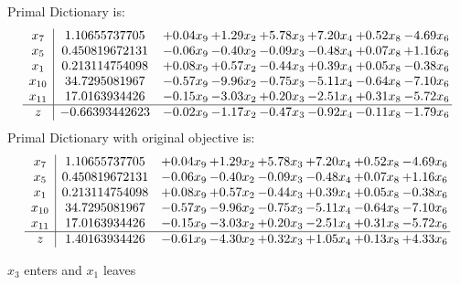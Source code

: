 \documentclass[8pt]{article}
\begin{document}
Primal Dictionary is:
\[\begin{array}{c| c c@{\hskip 2pt} c@{\hskip 2pt} c@{\hskip 2pt} c@{\hskip 2pt} c@{\hskip 2pt} c@{\hskip 2pt} }
 x_{7}   &  1.10655737705 & +  0.04 x_{9} & +  1.29 x_{2} & +  5.78 x_{3} & +  7.20 x_{4} & +  0.52 x_{8} & -4.69 x_{6}\\
 x_{5}   &  0.450819672131 & -0.06 x_{9} & -0.40 x_{2} & -0.09 x_{3} & -0.48 x_{4} & +  0.07 x_{8} & +  1.16 x_{6}\\
 x_{1}   &  0.213114754098 & +  0.08 x_{9} & +  0.57 x_{2} & -0.44 x_{3} & +  0.39 x_{4} & +  0.05 x_{8} & -0.38 x_{6}\\
 x_{10}   &  34.7295081967 & -0.57 x_{9} & -9.96 x_{2} & -0.75 x_{3} & -5.11 x_{4} & -0.64 x_{8} & -7.10 x_{6}\\
 x_{11}   &  17.0163934426 & -0.15 x_{9} & -3.03 x_{2} & +  0.20 x_{3} & -2.51 x_{4} & +  0.31 x_{8} & -5.72 x_{6}\\
\hline
z    &  -0.66393442623 & -0.02 x_{9} & -1.17 x_{2} & -0.47 x_{3} & -0.92 x_{4} & -0.11 x_{8} & -1.79 x_{6}\\
\end{array}\]
Primal Dictionary with original objective is:
\[\begin{array}{c| c c@{\hskip 2pt} c@{\hskip 2pt} c@{\hskip 2pt} c@{\hskip 2pt} c@{\hskip 2pt} c@{\hskip 2pt} }
 x_{7}   &  1.10655737705 & +  0.04 x_{9} & +  1.29 x_{2} & +  5.78 x_{3} & +  7.20 x_{4} & +  0.52 x_{8} & -4.69 x_{6}\\
 x_{5}   &  0.450819672131 & -0.06 x_{9} & -0.40 x_{2} & -0.09 x_{3} & -0.48 x_{4} & +  0.07 x_{8} & +  1.16 x_{6}\\
 x_{1}   &  0.213114754098 & +  0.08 x_{9} & +  0.57 x_{2} & -0.44 x_{3} & +  0.39 x_{4} & +  0.05 x_{8} & -0.38 x_{6}\\
 x_{10}   &  34.7295081967 & -0.57 x_{9} & -9.96 x_{2} & -0.75 x_{3} & -5.11 x_{4} & -0.64 x_{8} & -7.10 x_{6}\\
 x_{11}   &  17.0163934426 & -0.15 x_{9} & -3.03 x_{2} & +  0.20 x_{3} & -2.51 x_{4} & +  0.31 x_{8} & -5.72 x_{6}\\
\hline
z    &  1.40163934426 & -0.61 x_{9} & -4.30 x_{2} & +  0.32 x_{3} & +  1.05 x_{4} & +  0.13 x_{8} & +  4.33 x_{6}\\
\end{array}\]


 $ x_{3} $ enters and $ x_{1} $ leaves 
\end{document}
